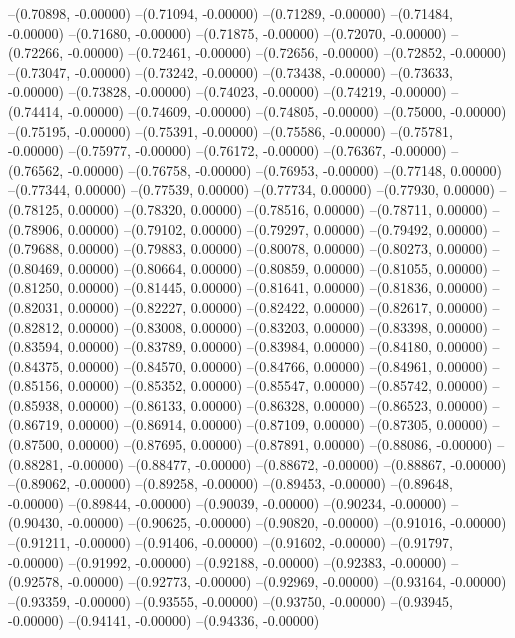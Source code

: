 --(0.70898, -0.00000)
--(0.71094, -0.00000)
--(0.71289, -0.00000)
--(0.71484, -0.00000)
--(0.71680, -0.00000)
--(0.71875, -0.00000)
--(0.72070, -0.00000)
--(0.72266, -0.00000)
--(0.72461, -0.00000)
--(0.72656, -0.00000)
--(0.72852, -0.00000)
--(0.73047, -0.00000)
--(0.73242, -0.00000)
--(0.73438, -0.00000)
--(0.73633, -0.00000)
--(0.73828, -0.00000)
--(0.74023, -0.00000)
--(0.74219, -0.00000)
--(0.74414, -0.00000)
--(0.74609, -0.00000)
--(0.74805, -0.00000)
--(0.75000, -0.00000)
--(0.75195, -0.00000)
--(0.75391, -0.00000)
--(0.75586, -0.00000)
--(0.75781, -0.00000)
--(0.75977, -0.00000)
--(0.76172, -0.00000)
--(0.76367, -0.00000)
--(0.76562, -0.00000)
--(0.76758, -0.00000)
--(0.76953, -0.00000)
--(0.77148, 0.00000)
--(0.77344, 0.00000)
--(0.77539, 0.00000)
--(0.77734, 0.00000)
--(0.77930, 0.00000)
--(0.78125, 0.00000)
--(0.78320, 0.00000)
--(0.78516, 0.00000)
--(0.78711, 0.00000)
--(0.78906, 0.00000)
--(0.79102, 0.00000)
--(0.79297, 0.00000)
--(0.79492, 0.00000)
--(0.79688, 0.00000)
--(0.79883, 0.00000)
--(0.80078, 0.00000)
--(0.80273, 0.00000)
--(0.80469, 0.00000)
--(0.80664, 0.00000)
--(0.80859, 0.00000)
--(0.81055, 0.00000)
--(0.81250, 0.00000)
--(0.81445, 0.00000)
--(0.81641, 0.00000)
--(0.81836, 0.00000)
--(0.82031, 0.00000)
--(0.82227, 0.00000)
--(0.82422, 0.00000)
--(0.82617, 0.00000)
--(0.82812, 0.00000)
--(0.83008, 0.00000)
--(0.83203, 0.00000)
--(0.83398, 0.00000)
--(0.83594, 0.00000)
--(0.83789, 0.00000)
--(0.83984, 0.00000)
--(0.84180, 0.00000)
--(0.84375, 0.00000)
--(0.84570, 0.00000)
--(0.84766, 0.00000)
--(0.84961, 0.00000)
--(0.85156, 0.00000)
--(0.85352, 0.00000)
--(0.85547, 0.00000)
--(0.85742, 0.00000)
--(0.85938, 0.00000)
--(0.86133, 0.00000)
--(0.86328, 0.00000)
--(0.86523, 0.00000)
--(0.86719, 0.00000)
--(0.86914, 0.00000)
--(0.87109, 0.00000)
--(0.87305, 0.00000)
--(0.87500, 0.00000)
--(0.87695, 0.00000)
--(0.87891, 0.00000)
--(0.88086, -0.00000)
--(0.88281, -0.00000)
--(0.88477, -0.00000)
--(0.88672, -0.00000)
--(0.88867, -0.00000)
--(0.89062, -0.00000)
--(0.89258, -0.00000)
--(0.89453, -0.00000)
--(0.89648, -0.00000)
--(0.89844, -0.00000)
--(0.90039, -0.00000)
--(0.90234, -0.00000)
--(0.90430, -0.00000)
--(0.90625, -0.00000)
--(0.90820, -0.00000)
--(0.91016, -0.00000)
--(0.91211, -0.00000)
--(0.91406, -0.00000)
--(0.91602, -0.00000)
--(0.91797, -0.00000)
--(0.91992, -0.00000)
--(0.92188, -0.00000)
--(0.92383, -0.00000)
--(0.92578, -0.00000)
--(0.92773, -0.00000)
--(0.92969, -0.00000)
--(0.93164, -0.00000)
--(0.93359, -0.00000)
--(0.93555, -0.00000)
--(0.93750, -0.00000)
--(0.93945, -0.00000)
--(0.94141, -0.00000)
--(0.94336, -0.00000)
